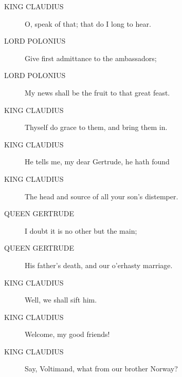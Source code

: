 \documentclass{article}
\begin{document}
\begin{description}
            
\item[KING CLAUDIUS] O, speak of that; that do I long to hear.
\end{description}
          
\begin{description}
            
\item[LORD POLONIUS] Give first admittance to the ambassadors;
\item[LORD POLONIUS] My news shall be the fruit to that great feast.
\end{description}
          
\begin{description}
            
\item[KING CLAUDIUS] Thyself do grace to them, and bring them in.
\item[KING CLAUDIUS] He tells me, my dear Gertrude, he hath found
\item[KING CLAUDIUS] The head and source of all your son's distemper.
\end{description}
          
\begin{description}
            
\item[QUEEN GERTRUDE] I doubt it is no other but the main;
\item[QUEEN GERTRUDE] His father's death, and our o'erhasty marriage.
\end{description}
          
\begin{description}
            
\item[KING CLAUDIUS] Well, we shall sift him.
\item[KING CLAUDIUS] Welcome, my good friends!
\item[KING CLAUDIUS] Say, Voltimand, what from our brother Norway?
\end{description}
          
\end{document}
